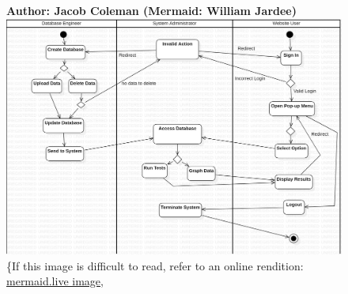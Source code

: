 \documentclass[11pt]{article}
\begin{document}
\begin{figure}[!ht]
\centering
\textbf{Author: Jacob Coleman (Mermaid: William Jardee)}
	\includegraphics[width=.95\textwidth]{./Activity Diagram/activitydiagram2}\\
	\{If this image is difficult to read, refer to an online rendition: \href{https://mermaid.ink/img/pako:eNp9lW1r2zAQx7-K0cuRpLWdB8eUQlnLGGx0tCuDLSMo8sUWs2Vjyd2ykO--04Mjt0mXN5Hudzrdnf8-7wmrMyApkYoquOU0b2k1fo5WIsAfiDwNbqmiGyohuBM5FwCtZXIn1zQL0uBxJxVUwU1WccGlaqmqnctv2Kw7CS06fYON5AqCJ9mfZ-06owrR-xbw6uM1lnaNo09NWeM1mlqSQenQLZTgDg4P2WT1yew0rgRhctZ_qna5W8TFMy25ph_d6oYpXgtLKWMmOOIbxkDKV4HbtQKps3roRPAVl9Lac5fsh5Y2xSBXBS32CxNM0dstX6Qj11xgojwXmI81VSA6DHXfgAi-1M24a4ypr6wEpkxtZnHf-OQ_1XndqZXbmUdtyw2urlhRcwbX10Ome8wKYL_e4Fxg-hQvOY8rKkzVQ2r50AvFtbd7_fvx7ud4fO1U4c1OJRq5qJ7112hoH_155hTjYS-hHppSX2JbvY88eNKnLk45Hg-FqB2M6jzWW23uNWXJ4ehg-9O_PYMmZVw2Jd1p7bvVA8iu7LXm-mivRPl4a6_tU6J3vohXJ85X55FX31GetlytwGG9RpGnJQ9r-k-8Xr49sHuDjq-Rp0eTccB-9OI7DNVnx9f-pEXecJrqmcuOY8F2yr0Ww6jOpLmdEW_A_KVG3TwxErUd8iz36h0iXR8ZkQqzpDzDmW6qWxFVQAUrkuIygy1FvazIShzQtTMj8i7jOLJJuqWlhBGhnaofd4KRVLUd9E7u03D00lMZ8NCeqF2jPyA5zn4MyWqx5bm2d22J5kKpRqYXFxpPcq6KbjNhdXUheVbQVhXPy_nFPJonNIphvojpLI4ztgmXyTaahttscRlGlBwOI9JQoaP-IWmcRJNkeRnOF1E8j6MkHJEdScezSRjNZtMonMfJNEkWCzz0t64x5XByGU5ny-VsGSWzCG-ITbjvBtoiwfTgs_0Wmk_i4R9q0ioj?type=png)](https://mermaid.live/edit#pako:eNp9lW1r2zAQx7-K0cuRpLWdB8eUQlnLGGx0tCuDLSMo8sUWs2Vjyd2ykO--04Mjt0mXN5Hudzrdnf8-7wmrMyApkYoquOU0b2k1fo5WIsAfiDwNbqmiGyohuBM5FwCtZXIn1zQL0uBxJxVUwU1WccGlaqmqnctv2Kw7CS06fYON5AqCJ9mfZ-06owrR-xbw6uM1lnaNo09NWeM1mlqSQenQLZTgDg4P2WT1yew0rgRhctZ_qna5W8TFMy25ph_d6oYpXgtLKWMmOOIbxkDKV4HbtQKps3roRPAVl9Lac5fsh5Y2xSBXBS32CxNM0dstX6Qj11xgojwXmI81VSA6DHXfgAi-1M24a4ypr6wEpkxtZnHf-OQ_1XndqZXbmUdtyw2urlhRcwbX10Ome8wKYL_e4Fxg-hQvOY8rKkzVQ2r50AvFtbd7_fvx7ud4fO1U4c1OJRq5qJ7112hoH_155hTjYS-hHppSX2JbvY88eNKnLk45Hg-FqB2M6jzWW23uNWXJ4ehg-9O_PYMmZVw2Jd1p7bvVA8iu7LXm-mivRPl4a6_tU6J3vohXJ85X55FX31GetlytwGG9RpGnJQ9r-k-8Xr49sHuDjq-Rp0eTccB-9OI7DNVnx9f-pEXecJrqmcuOY8F2yr0Ww6jOpLmdEW_A_KVG3TwxErUd8iz36h0iXR8ZkQqzpDzDmW6qWxFVQAUrkuIygy1FvazIShzQtTMj8i7jOLJJuqWlhBGhnaofd4KRVLUd9E7u03D00lMZ8NCeqF2jPyA5zn4MyWqx5bm2d22J5kKpRqYXFxpPcq6KbjNhdXUheVbQVhXPy_nFPJonNIphvojpLI4ztgmXyTaahttscRlGlBwOI9JQoaP-IWmcRJNkeRnOF1E8j6MkHJEdScezSRjNZtMonMfJNEkWCzz0t64x5XByGU5ny-VsGSWzCG-ITbjvBtoiwfTgs_0Wmk_i4R9q0ioj}{mermaid.live image}, 

\end{figure}
\end{document}
